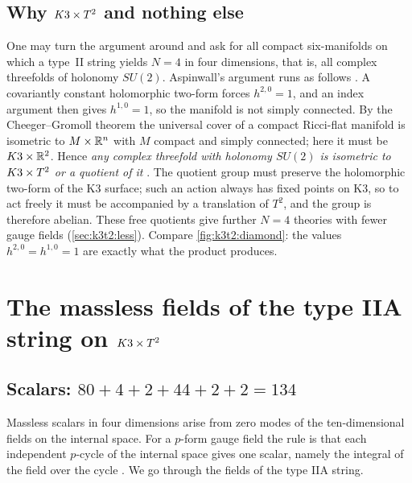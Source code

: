 \subsection{Why \texorpdfstring{$K3\times T^2$}{K3 x T2} and nothing else}
One may turn the argument around and ask for all compact six-manifolds on which a type~II
string yields $N=4$ in four dimensions, that is, all complex threefolds of holonomy $SU(2)$.
Aspinwall's argument runs as follows . A covariantly constant
holomorphic two-form forces $h^{2,0}=1$, and an index argument then gives $h^{1,0}=1$, so the
manifold is not simply connected. By the Cheeger--Gromoll theorem the universal cover of a
compact Ricci-flat manifold is isometric to $M\times\mathbb{R}^n$ with $M$ compact and simply
connected; here it must be $K3\times\mathbb{R}^2$. Hence \emph{any complex threefold with holonomy
$SU(2)$ is isometric to $K3\times T^2$ or a quotient of it} \TL. The quotient group must preserve the
holomorphic two-form of the K3 surface; such an action always has fixed points on K3, so to
act freely it must be accompanied by a translation of $T^2$, and the group is therefore abelian.
These free quotients give further $N=4$ theories with fewer gauge fields
(\cref{sec:k3t2:less}). Compare \cref{fig:k3t2:diamond}: the values $h^{2,0}=h^{1,0}=1$ are
exactly what the product produces.

\section{The massless fields of the type IIA string on \texorpdfstring{$K3\times T^2$}{K3 x T2}}
\label{sec:k3t2:fields}

\subsection{Scalars: \texorpdfstring{$80+4+2+44+2+2=134$}{134}}
Massless scalars in four dimensions arise from zero modes of the ten-dimensional fields on the
internal space. For a $p$-form gauge field the rule is that each independent $p$-cycle of the
internal space gives one scalar, namely the integral of the field over the cycle
. We go through the fields of the type IIA string.

